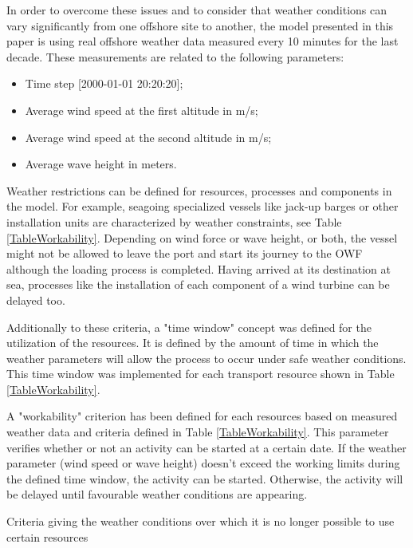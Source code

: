 In order to overcome these issues and to consider that weather conditions can vary significantly from one offshore site to another, the model presented in this paper is using real offshore weather data measured every 10 minutes for the last decade.  
These measurements are related to the following parameters:
\begin{itemize}
\item Time step [2000-01-01 20:20:20];
\item Average wind speed at the first altitude in m/s;
\item Average wind speed at the second altitude in m/s;
\item Average wave height in meters.
\end{itemize}

Weather restrictions can be defined for resources, processes and components in the model. For example, seagoing specialized vessels like jack-up barges or other installation units are characterized by weather constraints, see Table \ref{TableWorkability}. Depending on wind force or wave height, or both, the vessel might not be allowed to leave the port and start its journey to the OWF although the loading process is completed. Having arrived at its destination at sea, processes like the installation of each component of a wind turbine can be delayed too.

Additionally to these criteria, a "time window" concept was defined for the utilization of the resources. It is defined by the amount of time in which the weather parameters will allow the process to occur under safe weather conditions. This time window was implemented for each transport resource shown in Table \ref{TableWorkability}.

A "workability" criterion has been defined for each resources based on measured weather data and criteria defined in Table \ref{TableWorkability}. This parameter verifies whether or not an activity can be started at a certain date. If the weather parameter (wind speed or wave height) doesn't exceed the working limits during the defined time window, the activity can be started. Otherwise, the activity will be delayed until favourable weather conditions are appearing.

\begin{table}[!hbp]
\caption{Criteria giving the weather conditions over which it is no longer possible to use certain resources}
\begin{center}

\end{center}
\label{TableWorkability}
\end{table}

